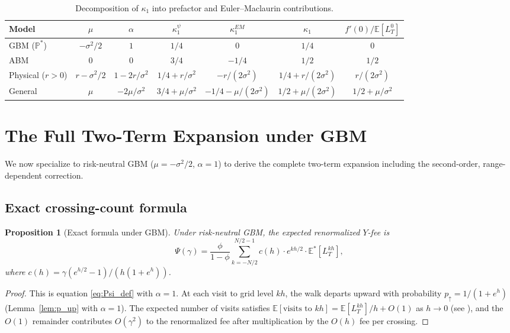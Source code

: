 \documentclass[11pt]{article}
\newtheorem{proposition}[theorem]{Proposition}
\theoremstyle{definition}
\theoremstyle{remark}
\newcommand{\E}{\mathbb{E}}
\newcommand{\PP}{\mathbb{P}}
\begin{document}
\begin{table}[h]
\centering
\caption{Decomposition of $\kappa_1$ into prefactor and
Euler--Maclaurin contributions.}
\label{tab:decomposition}
\begin{tabular}{lcccccc}
\toprule
Model & $\mu$ & $\alpha$ & $\kappa_1^{\psi}$
& $\kappa_1^{EM}$ & $\kappa_1$ & $f'(0)/\E[L^0_T]$ \\
\midrule
GBM ($\PP^*$) & $-\sigma^2/2$ & $1$ & $1/4$ & $0$ & $1/4$ & $0$ \\
ABM & $0$ & $0$ & $3/4$ & $-1/4$ & $1/2$ & $1/2$ \\
Physical ($r > 0$) & $r - \sigma^2/2$ & $1 - 2r/\sigma^2$
& $1/4 + r/\sigma^2$ & $-r/(2\sigma^2)$ & $1/4 + r/(2\sigma^2)$
& $r/(2\sigma^2)$ \\
General & $\mu$ & $-2\mu/\sigma^2$
& $3/4 + \mu/\sigma^2$ & $-1/4 - \mu/(2\sigma^2)$
& $1/2 + \mu/(2\sigma^2)$ & $1/2 + \mu/\sigma^2$ \\
\bottomrule
\end{tabular}
\end{table}

\section{The Full Two-Term Expansion under GBM}\label{sec:gbm}

We now specialize to risk-neutral GBM ($\mu = -\sigma^2/2$,
$\alpha = 1$) to derive the complete two-term expansion including the
second-order, range-dependent correction.

\subsection{Exact crossing-count formula}

\begin{proposition}[Exact formula under GBM]\label{prop:exact}
Under risk-neutral GBM, the expected renormalized $Y$-fee is
\begin{equation}\label{eq:exact}
\Psi(\gamma) = \frac{\phi}{1 - \phi}
\sum_{k=-N/2}^{N/2-1} c(h) \cdot e^{kh/2} \cdot \E^*[L^{kh}_T],
\end{equation}
where $c(h) = \gamma(e^{h/2} - 1)/(h(1 + e^h))$.
\end{proposition}
\begin{proof}
This is equation \eqref{eq:Psi_def} with $\alpha = 1$.
At each visit to grid level $kh$, the walk departs upward with
probability $p_\uparrow = 1/(1 + e^h)$
(Lemma~\ref{lem:p_up} with $\alpha = 1$).
The expected number of visits satisfies
$\E[\text{visits to }kh] = \E[L^{kh}_T]/h + O(1)$ as $h \to 0$
(see \citealt{GobetLandon2014,GobetStazhynski2020}), and the
$O(1)$ remainder contributes $O(\gamma^2)$ to the renormalized fee
after multiplication by the $O(h)$ fee per crossing.
\end{proof}
\end{document}
